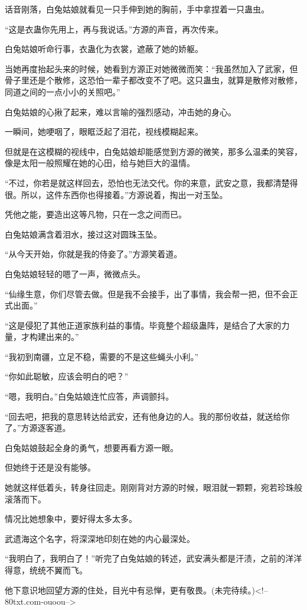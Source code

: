 \begin{this_body}
话音刚落，白兔姑娘就看见一只手伸到她的胸前，手中拿捏着一只蛊虫。

“这是衣蛊你先用上，再与我说话。”方源的声音，再次传来。

白兔姑娘听命行事，衣蛊化为衣裳，遮蔽了她的娇躯。

当她再度抬起头来的时候，她看到方源正对她微微而笑：“我虽然加入了武家，但骨子里还是个散修，这恐怕一辈子都改变不了吧。这只蛊虫，就算是散修对散修，同道之间的一点小小的关照吧。”

白兔姑娘的心揪了起来，难以言喻的强烈感动，冲击她的身心。

一瞬间，她哽咽了，眼眶泛起了泪花，视线模糊起来。

但就是在这模糊的视线中，白兔姑娘却能感觉到方源的微笑，那多么温柔的笑容，像是太阳一般照耀在她的心田，给与她巨大的温情。

“不过，你若是就这样回去，恐怕也无法交代。你的来意，武安之意，我都清楚得很。所以，这件东西你也得接着。”方源说着，掏出一对玉坠。

凭他之能，要造出这等凡物，只在一念之间而已。

白兔姑娘满含着泪水，接过这对圆珠玉坠。

“从今天开始，你就是我的侍妾了。”方源笑着道。

白兔姑娘轻轻的嗯了一声，微微点头。

“仙缘生意，你们尽管去做。但是我不会接手，出了事情，我会帮一把，但不会正式出面。”

“这是侵犯了其他正道家族利益的事情。毕竟整个超级蛊阵，是结合了大家的力量，才构建出来的。”

“我初到南疆，立足不稳，需要的不是这些蝇头小利。”

“你如此聪敏，应该会明白的吧？”

“嗯，我明白。”白兔姑娘连忙应答，声调颤抖。

“回去吧，把我的意思转达给武安，还有他身边的人。我的那份收益，就送给你了。”方源逐客道。

白兔姑娘鼓起全身的勇气，想要再看方源一眼。

但她终于还是没有能够。

她就这样低着头，转身往回走。刚刚背对方源的时候，眼泪就一颗颗，宛若珍珠般滚落而下。

情况比她想象中，要好得太多太多。

武遗海这个名字，将深深地印刻在她的内心最深处。

“我明白了，我明白了！”听完了白兔姑娘的转述，武安满头都是汗渍，之前的洋洋得意，统统不翼而飞。

他下意识地回望方源的住处，目光中有忌惮，更有敬畏。(未完待续。)<!--80txt.com-ouoou-->

\end{this_body}

